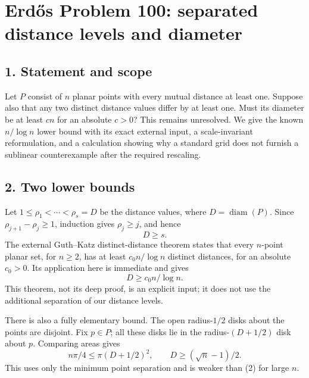 \section*{Erd\H{o}s Problem 100: separated distance levels and diameter}

\subsection*{1. Statement and scope}
Let $P$ consist of $n$ planar points with every mutual distance at least one. Suppose also that any two distinct distance values differ by at least one. Must its diameter be at least $cn$ for an absolute $c>0$? This remains unresolved. We give the known $n/\log n$ lower bound with its exact external input, a scale-invariant reformulation, and a calculation showing why a standard grid does not furnish a sublinear counterexample after the required rescaling.

\subsection*{2. Two lower bounds}
Let $1\le\rho_1<\cdots<\rho_s=D$ be the distance values, where $D=\operatorname{diam}(P)$. Since $\rho_{j+1}-\rho_j\ge1$, induction gives $\rho_j\ge j$, and hence
\[
 D\ge s.\tag{1}
\]
The external Guth--Katz distinct-distance theorem states that every $n$-point planar set, for $n\ge2$, has at least $c_0 n/\log n$ distinct distances, for an absolute $c_0>0$. Its application here is immediate and gives
\[
 D\ge c_0 n/\log n.\tag{2}
\]
This theorem, not its deep proof, is an explicit input; it does not use the additional separation of our distance levels.

There is also a fully elementary bound. The open radius-$1/2$ disks about the points are disjoint. Fix $p\in P$; all these disks lie in the radius-$(D+1/2)$ disk about $p$. Comparing areas gives
\[
 n\pi/4\le\pi(D+1/2)^2,
 \qquad D\ge(\sqrt n-1)/2.\tag{3}
\]
This uses only the minimum point separation and is weaker than (2) for large $n$.

